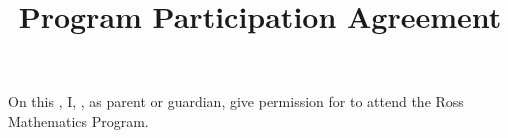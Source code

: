 \documentclass{ross}
\title{Program Participation Agreement}
\begin{document}
\maketitle


On this \genblank[date]{\phantom{\hspace{1in}}}, I, , 
as parent or guardian,
give permission for  to attend the Ross Mathematics Program. 
\end{document}
